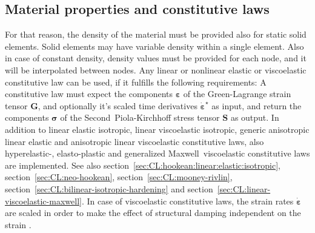 \subsection{Material properties and constitutive laws}
For that reason, the density of the material must be provided also for static solid elements.
Solid elements may have variable density within a single element.
Also in case of constant density, density values must be provided for each node, and it will be interpolated between nodes.
Any linear or nonlinear elastic or viscoelastic constitutive law can be used, if it fulfills the following requirements:
A constitutive law must expect the components $\boldsymbol{\varepsilon}$ of the Green-Lagrange strain tensor $\boldsymbol{G}$,
and optionally it's scaled time derivatives $\dot{\boldsymbol{\varepsilon}}^{\star}$ as input, and return the components $\boldsymbol{\sigma}$
of the Second~Piola-Kirchhoff stress tensor $\boldsymbol{S}$ as output. In addition to linear elastic isotropic, linear viscoelastic isotropic,
generic anisotropic linear elastic and anisotropic linear viscoelastic constitutive laws, also hyperelastic-, elasto-plastic
and generalized Maxwell~viscoelastic constitutive laws are implemented.
See also section~\ref{sec:CL:hookean:linear:elastic:isotropic}, section~\ref{sec:CL:neo-hookean}, section~\ref{sec:CL:mooney-rivlin},
section~\ref{sec:CL:bilinear-isotropic-hardening} and section~\ref{sec:CL:linear-viscoelastic-maxwell}.
In case of viscoelastic constitutive laws, the strain rates $\dot{\boldsymbol{\varepsilon}}$ are scaled in order to make
the effect of structural damping independent on the strain \cite{KUEBLER2005}.

